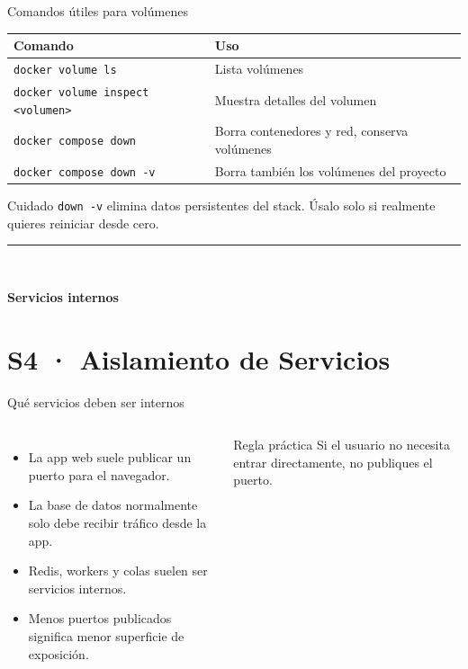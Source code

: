 \documentclass[aspectratio=169]{beamer}
\newcommand{\MainHeaderSlide}[2]{%
  \begingroup
  \setbeamercolor{background canvas}{bg=white}
  \begin{frame}[plain]
    \vfill
    \hspace*{0.9cm}%
    \begin{minipage}{0.78\paperwidth}
      {\color{UUblack}\rule{4cm}{1.3pt}}\\[14pt]
      {\raggedright\color{UUblack}\fontsize{36}{42}\selectfont\rmfamily\bfseries #1\par}
    \end{minipage}
    \vfill
  \end{frame}
  \endgroup
}
\begin{document}
\begin{frame}[fragile]{Comandos útiles para volúmenes}
  \footnotesize
  \begin{tabular}{p{} p{}}
    \toprule
    Comando & Uso \\
    \midrule
    \texttt{docker volume ls} & Lista volúmenes \\
    \texttt{docker volume inspect <volumen>} & Muestra detalles del volumen \\
    \texttt{docker compose down} & Borra contenedores y red, conserva volúmenes \\
    \texttt{docker compose down -v} & Borra también los volúmenes del proyecto \\
    \bottomrule
  \end{tabular}
  \vspace{0.2cm}
  \begin{alertblock}{Cuidado}
    \texttt{down -v} elimina datos persistentes del stack. Úsalo solo si realmente quieres reiniciar desde cero.
  \end{alertblock}
\end{frame}

\MainHeaderSlide{Servicios internos}{Aislar bases de datos y componentes privados}
\section{S4 · Aislamiento de Servicios}

\begin{frame}{Qué servicios deben ser internos}
  \begin{columns}[c]
    \small
    \begin{itemize}
      \item La app web suele publicar un puerto para el navegador.
      \item La base de datos normalmente solo debe recibir tráfico desde la app.
      \item Redis, workers y colas suelen ser servicios internos.
      \item Menos puertos publicados significa menor superficie de exposición.
    \end{itemize}
    \begin{alertblock}{Regla práctica}
      Si el usuario no necesita entrar directamente, no publiques el puerto.
    \end{alertblock}
    \centering
  \end{columns}
\end{frame}
\end{document}
